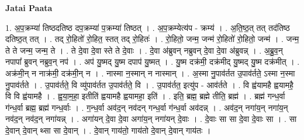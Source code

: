 \documentclass[17pt]{extarticle}
\begin{document}
\textbf{Jatai Paata} \newline

1. अ॒प॒क्रम्या॑ तिष्ठदतिष्ठ दप॒क्रम्या॑ प॒क्रम्या॑ तिष्ठत् । . अ॒प॒क्रम्येत्य॑प - क्रम्य॑ । . अ॒ति॒ष्ठ॒त् तत् तद॑तिष्ठ दतिष्ठ॒त् तत् । . तद् रो॒हितो॑ रो॒हित॒ स्तत् तद् रो॒हितः॑ । . रो॒हितो॒ जन्म॒ जन्म॑ रो॒हितो॑ रो॒हितो॒ जन्म॑ । . जन्म॒ ते ते जन्म॒ जन्म॒ ते । . ते दे॒वा दे॒वा स्ते ते दे॒वाः । . दे॒वा अ॑ब्रुवन् नब्रुवन् दे॒वा दे॒वा अ॑ब्रुवन्न् । . अ॒ब्रु॒व॒न् नपापा᳚ ब्रुवन् नब्रुव॒न् नप॑ । . अप॑ यु॒ष्मद् यु॒ष्म दपाप॑ यु॒ष्मत् । . यु॒ष्म दक्र॑मी॒ दक्र॑मीद् यु॒ष्मद् यु॒ष्म दक्र॑मीत् । . अक्र॑मी॒न् न नाक्र॑मी॒ दक्र॑मी॒न् न । . नास्मा न॒स्मान् न नास्मान् । . अ॒स्मा नु॒पाव॑र्तत उ॒पाव॑र्तते॒ ऽस्मा न॒स्मा नु॒पाव॑र्तते । . उ॒पाव॑र्तते॒ वि व्यु॑पाव॑र्तत उ॒पाव॑र्तते॒ वि । . उ॒पाव॑र्तत॒ इत्यु॑प - आव॑र्तते । . वि ह्व॑यामहै ह्वयामहै॒ वि वि ह्व॑यामहै । . ह्व॒या॒म॒हा॒ इतीति॑ ह्वयामहै ह्वयामहा॒ इति॑ । . इति॒ ब्रह्म॒ ब्रह्मे तीति॒ ब्रह्म॑ । . ब्रह्म॑ गन्ध॒र्वा ग॑न्ध॒र्वा ब्रह्म॒ ब्रह्म॑ गन्ध॒र्वाः । . ग॒न्ध॒र्वा अव॑द॒न् नव॑दन् गन्ध॒र्वा ग॑न्ध॒र्वा अव॑दन्न् । . अव॑द॒न् नगा॑य॒न् नगा॑य॒न् नव॑द॒न् नव॑द॒न् नगा॑यन्न् । . अगा॑यन् दे॒वा दे॒वा अगा॑य॒न् नगा॑यन् दे॒वाः । . दे॒वाः सा सा दे॒वा दे॒वाः सा । . सा दे॒वान् दे॒वान् थ्सा सा दे॒वान् । . दे॒वान् गाय॑तो॒ गाय॑तो दे॒वान् दे॒वान् गाय॑तः । \newline
\end{document}
